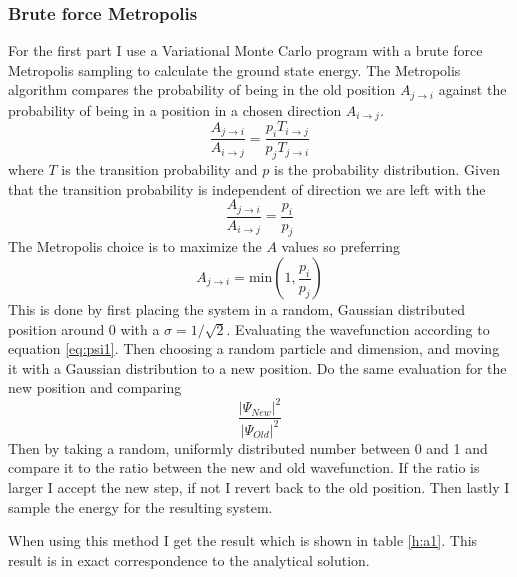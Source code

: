 \documentclass[12pt]{article}
\begin{document}
  \subsubsection{Brute force Metropolis}
  For the first part I use a Variational Monte Carlo program with a brute force Metropolis
  sampling to calculate the ground state energy. The Metropolis algorithm compares the 
  probability of being in the old position $A_{j\rightarrow i}$ against the probability
  of being in a position in a chosen direction $A_{i\rightarrow j}$.
  \begin{equation}
    \frac{A_{j\rightarrow i}}{A_{i\rightarrow j}} = %
    \frac{p_i T_{i\rightarrow j}}{p_j T_{j\rightarrow i}}
  \end{equation}
  where $T$ is the transition probability and $p$ is the probability distribution.
  Given that the transition probability is independent of direction we are left with the
  \begin{equation}
    \frac{A_{j\rightarrow i}}{A_{i\rightarrow j}} = %
    \frac{p_i}{p_j}
  \end{equation}
  The Metropolis choice is to maximize the $A$ values so preferring
  \begin{equation}
    A_{j\rightarrow i} = \text{min}\left(1,\frac{p_i}{p_j}\right)
  \end{equation}
  This is done by first placing the system in a random, Gaussian distributed position 
  around 0 with a $\sigma = 1/\sqrt{2}$. Evaluating the wavefunction according to 
  equation \ref{eq:psi1}. Then choosing a random particle and dimension, and moving 
  it with a Gaussian distribution to a new position. Do the same evaluation for the 
  new position and comparing
  \[\frac{|\Psi_{New}|^2}{|\Psi_{Old}|^2}\]
  Then by taking a random, uniformly distributed number between 0 and 1 and compare it
  to the ratio between the new and old wavefunction. If the ratio is larger I accept
  the new step, if not I revert back to the old position. Then lastly I sample the energy for
  the resulting system.
  
  When using this method I get the result which is shown in table \ref{h:a1}. This result is
  in exact correspondence to the analytical solution.
\end{document}
